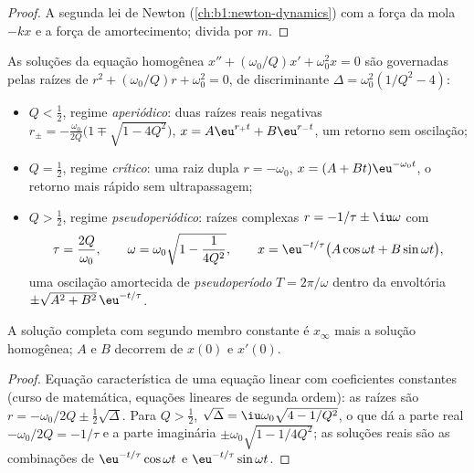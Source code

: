 \begin{proof}
A segunda lei de Newton (\cref{ch:b1:newton-dynamics}) com a força da mola
$-kx$ e a força de amortecimento; divida por $m$.
\end{proof}

\begin{theorem}\label{thm:b1:transient-regimes:regimes}
As soluções da equação homogênea $x'' + (\omega_0/Q)x' +
\omega_0^2 x = 0$ são governadas pelas raízes de $r^2 + (\omega_0/Q)r +
\omega_0^2 = 0$, de discriminante $\Delta = \omega_0^2(1/Q^2 - 4)$:
\begin{itemize}
  \item $Q < \tfrac12$, regime \emph{aperiódico}: duas raízes reais negativas
        $r_\pm = -\frac{\omega_0}{2Q}\big(1 \mp \sqrt{1 - 4Q^2}\big)$,
        $x = A\eu^{r_+t} + B\eu^{r_-t}$, um retorno sem oscilação;
  \item $Q = \tfrac12$, regime \emph{crítico}: uma raiz dupla $r = -\omega_0$,
        $x = (A + Bt)\eu^{-\omega_0 t}$, o retorno mais rápido sem
        ultrapassagem;
  \item $Q > \tfrac12$, regime \emph{pseudoperiódico}: raízes complexas
        $r = -1/\tau \pm \iu\omega$ com
        \[
        \tau = \frac{2Q}{\omega_0}, \qquad
        \omega = \omega_0\sqrt{1 - \frac{1}{4Q^2}},
        \qquad
        x = \eu^{-t/\tau}\big(A\cos\omega t + B\sin\omega t\big),
        \]
        uma oscilação amortecida de \emph{pseudoperíodo} $T = 2\pi/\omega$
        dentro da envoltória $\pm\sqrt{A^2 + B^2}\,\eu^{-t/\tau}$.
\end{itemize}
A solução completa com segundo membro constante é $x_\infty$ mais a
solução homogênea; $A$ e $B$ decorrem de $x(0)$ e $x'(0)$.
\end{theorem}

\begin{proof}
Equação característica de uma equação linear com coeficientes
constantes (curso de matemática, equações lineares de segunda ordem): as
raízes são $r = -\omega_0/2Q \pm \tfrac12\sqrt\Delta$. Para $Q > \tfrac12$,
$\sqrt\Delta = \iu\omega_0\sqrt{4 - 1/Q^2}$, o que dá a parte real
$-\omega_0/2Q = -1/\tau$ e a parte imaginária $\pm\omega_0\sqrt{1 - 1/4Q^2}$;
as soluções reais são as combinações de $\eu^{-t/\tau}\cos\omega t$
e $\eu^{-t/\tau}\sin\omega t$.
\end{proof}

